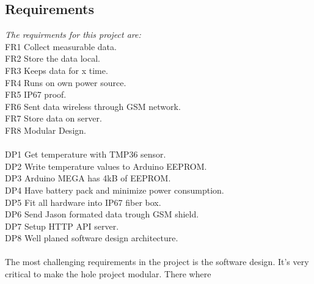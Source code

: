 \subsection{Requirements}
\textit{The requirments for this project are:}\\
FR1 Collect measurable data.\\
FR2 Store the data local.\\
FR3 Keeps data for x time.\\
FR4 Runs on own power source.\\
FR5 IP67 proof.\\
FR6 Sent data wireless through GSM network.\\
FR7 Store data on server.\\
FR8 Modular Design.\\
\\
DP1 Get temperature with TMP36 sensor.\\
DP2 Write temperature values to Arduino EEPROM.\\
DP3 Arduino MEGA has 4kB of EEPROM.\\
DP4 Have battery pack and minimize power consumption.\\
DP5 Fit all hardware into IP67 fiber box.\\
DP6 Send Jason formated data trough GSM shield.\\
DP7 Setup HTTP API server.\\
DP8 Well planed software design architecture.\\
\\
The most challenging requirements in the project is the software design. It's very critical to make the hole project modular. There where

